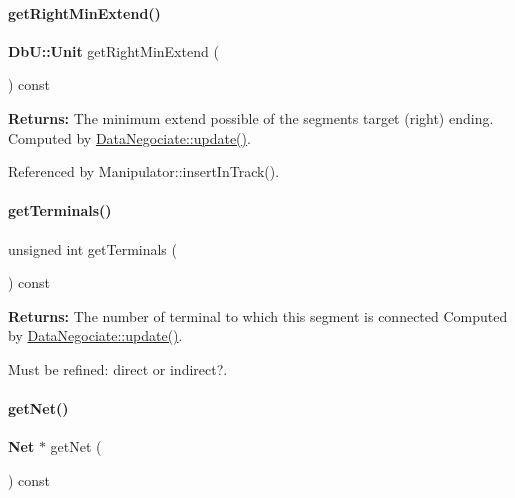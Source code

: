 \paragraph{\texorpdfstring{get\+Right\+Min\+Extend()}{getRightMinExtend()}}
{\footnotesize\ttfamily \textbf{ Db\+U\+::\+Unit} get\+Right\+Min\+Extend (\begin{DoxyParamCaption}{ }\end{DoxyParamCaption}) const\hspace{0.3cm}{\ttfamily [inline]}}

{\bfseries Returns\+:} The minimum extend possible of the segment\textquotesingle{}s target (right) ending. Computed by \mbox{\hyperlink{classKite_1_1DataNegociate_ac5c54df7ed3b930268c8d7752c101725}{Data\+Negociate\+::update()}}. 

Referenced by Manipulator\+::insert\+In\+Track().

\mbox{\label{classKite_1_1DataNegociate_a4f6fbcee2499d33394ab54f856c500c0}} 
\paragraph{\texorpdfstring{get\+Terminals()}{getTerminals()}}
{\footnotesize\ttfamily unsigned int get\+Terminals (\begin{DoxyParamCaption}{ }\end{DoxyParamCaption}) const\hspace{0.3cm}{\ttfamily [inline]}}

{\bfseries Returns\+:} The number of terminal to which this segment is connected Computed by \mbox{\hyperlink{classKite_1_1DataNegociate_ac5c54df7ed3b930268c8d7752c101725}{Data\+Negociate\+::update()}}.

Must be refined\+: direct or indirect?. \mbox{\label{classKite_1_1DataNegociate_a692492374623a5c6096b2c4a51190359}} 
\paragraph{\texorpdfstring{get\+Net()}{getNet()}}
{\footnotesize\ttfamily \textbf{ Net} $\ast$ get\+Net (\begin{DoxyParamCaption}{ }\end{DoxyParamCaption}) const\hspace{0.3cm}{\ttfamily [inline]}}

